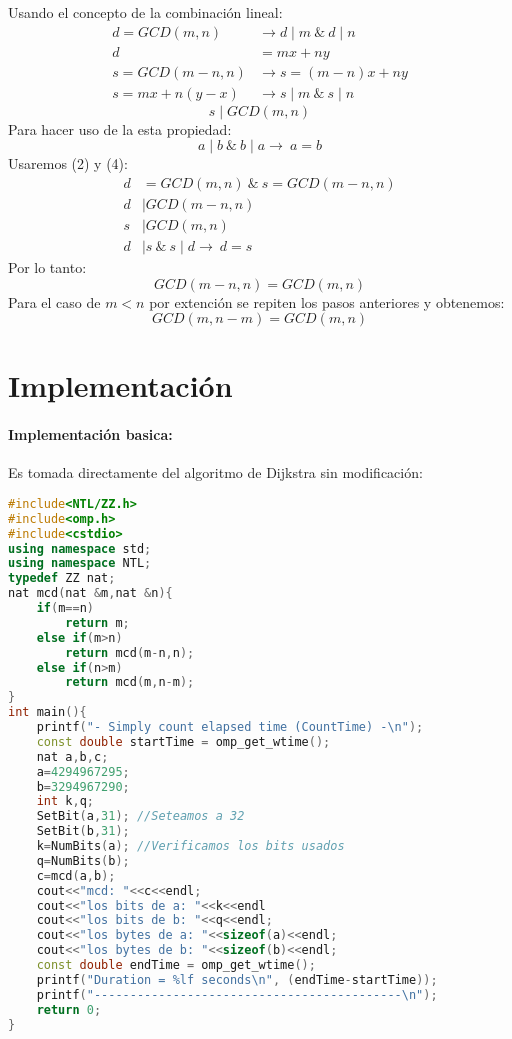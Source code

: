 \documentclass[a4paper,10pt]{article}
\begin{document}
Usando el concepto de la combinaci\'on lineal:
\begin{equation*}
 \begin{align}
  d=GCD(m,n) &\rightarrow d\mid m \:\&\: d\mid n \\
  d&=mx+ny\\
  s=GCD(m-n,n) &\rightarrow s=(m-n)x+ny \\
  s=mx+n(y-x) &\rightarrow s\mid m \:\&\: s\mid n 
 \end{align}
\end{equation*}
\begin{equation}
 s\mid GCD(m,n)
\end{equation}
Para hacer uso de la esta propiedad: 
\begin{equation*}
 a\mid b \:\&\:b\mid a\rightarrow\:a=b
\end{equation*}
Usaremos (2) y (4):
\begin{equation*}
 \begin{align}
  d&=GCD(m,n) \:\&\: s=GCD(m-n,n)\\
  d&\mid GCD(m-n,n)\\
  s&\mid GCD(m,n) \\
  d&\mid s \:\&\:s\mid d\rightarrow\:d=s 
 \end{align}
\end{equation*}
Por lo tanto:
\begin{equation}
 GCD(m-n,n)=GCD(m,n)
\end{equation}
Para el caso de $m<n$ por extenci\'on se repiten los pasos anteriores y obtenemos:
\begin{equation}
 GCD(m,n-m)=GCD(m,n)
\end{equation}

\section{Implementaci\'on}
\paragraph{Implementaci\'on basica:}
Es tomada directamente del algoritmo de Dijkstra sin modificaci\'on:
\begin{lstlisting}[language=C++]
#include<NTL/ZZ.h>
#include<omp.h>
#include<cstdio>
using namespace std;
using namespace NTL;
typedef ZZ nat;
nat mcd(nat &m,nat &n){
    if(m==n)
        return m;
    else if(m>n)
        return mcd(m-n,n);
    else if(n>m)
        return mcd(m,n-m);
}
int main(){
    printf("- Simply count elapsed time (CountTime) -\n");
    const double startTime = omp_get_wtime();
    nat a,b,c;
    a=4294967295;
    b=3294967290;
    int k,q;
    SetBit(a,31); //Seteamos a 32
    SetBit(b,31);
    k=NumBits(a); //Verificamos los bits usados
    q=NumBits(b);
    c=mcd(a,b);
    cout<<"mcd: "<<c<<endl;
    cout<<"los bits de a: "<<k<<endl
    cout<<"los bits de b: "<<q<<endl;
    cout<<"los bytes de a: "<<sizeof(a)<<endl;
    cout<<"los bytes de b: "<<sizeof(b)<<endl;
    const double endTime = omp_get_wtime();
    printf("Duration = %lf seconds\n", (endTime-startTime));
    printf("-------------------------------------------\n");
    return 0;
}
\end{lstlisting}
\end{document}
